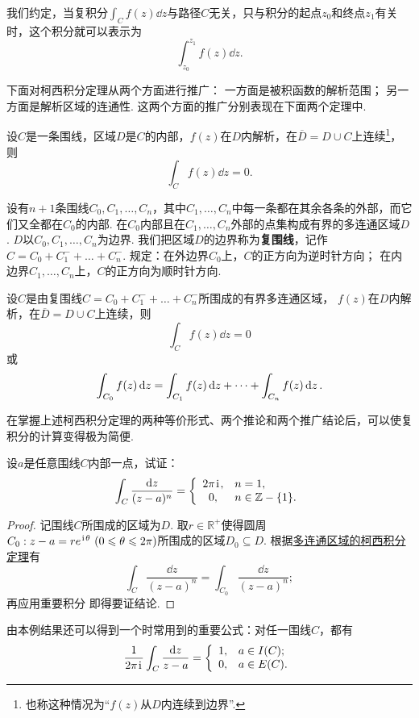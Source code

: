 我们约定，当复积分\(\int_C f(z) \dd{z}\)与路径\(C\)无关，只与积分的起点\(z_0\)和终点\(z_1\)有关时，这个积分就可以表示为\[
\int_{z_0}^{z_1} f(z) \dd{z}.
\]

下面对柯西积分定理从两个方面进行推广：
一方面是被积函数的解析范围；
另一方面是解析区域的连通性.
这两个方面的推广分别表现在下面两个定理中.
\begin{theorem}
设\(C\)是一条围线，区域\(D\)是\(C\)的内部，\(f(z)\)在\(D\)内解析，在\(\overline{D}=D \cup C\)上连续\footnote{%
也称这种情况为“\(f(z)\)从\(D\)内连续到边界”.%
}，则\[
\int_C f(z) \dd{z} = 0.
\]
\end{theorem}

\begin{definition}
设有\(n+1\)条围线\(C_0,C_1,\dots,C_n\)，其中\(C_1,\dots,C_n\)中每一条都在其余各条的外部，而它们又全都在\(C_0\)的内部.
在\(C_0\)内部且在\(C_1,\dots,C_n\)外部的点集构成有界的多连通区域\(D\).
\(D\)以\(C_0,C_1,\dots,C_n\)为边界.
我们把区域\(D\)的边界称为\textbf{复围线}，记作\(C=C_0+C_1^-+\dots+C_n^-\).
规定：在外边界\(C_0\)上，\(C\)的正方向为逆时针方向；
在内边界\(C_1,\dots,C_n\)上，\(C\)的正方向为顺时针方向.
\end{definition}

\begin{theorem}[多连通区域的柯西积分定理]\label{theorem:解析函数的积分表示.多连通区域的柯西积分定理}
设\(C\)是由复围线\(C=C_0+C_1^-+\dots+C_n^-\)所围成的有界多连通区域，%
\(f(z)\)在\(D\)内解析，在\(\overline{D}=D \cup C\)上连续，则\[
\int_C f(z) \dd{z} = 0
\]或\begin{equation}
\def\Ic#1{\int_{C_{#1}} f(z) \dd{z}}
\Ic{0} = \Ic{1} + \dots + \Ic{n}.
\end{equation}
\end{theorem}

在掌握上述柯西积分定理的两种等价形式、两个推论和两个推广结论后，可以使复积分的计算变得极为简便.

\begin{example}
设\(a\)是任意围线\(C\)内部一点，试证：\[
\int_C \frac{\dd{z}}{(z-a)^n} = \left\{ \begin{array}{cl}
2\pi\kern1pt\mathrm{i}\kern1pt, & n=1, \\
0, & n\in\mathbb{Z}-\{1\}.
\end{array} \right.
\]
\begin{proof}
记围线\(C\)所围成的区域为\(D\).
取\(r\in\mathbb{R}^+\)使得圆周\(C_0: z - a = r e^{\kern1pt\mathrm{i}\kern1pt\theta}\ (0 \leqslant \theta \leqslant 2\pi)\)所围成的区域\(D_0 \subseteq D\).
根据\hyperref[theorem:解析函数的积分表示.多连通区域的柯西积分定理]{多连通区域的柯西积分定理}有\[
\int_C \frac{\dd{z}}{(z-a)^n} = \int_{C_0} \frac{\dd{z}}{(z-a)^n};
\]再应用重要积分  即得要证结论.
\end{proof}
\end{example}
由本例结果还可以得到一个时常用到的重要公式：对任一围线\(C\)，都有\begin{equation}\label{equation.解析函数的积分表示.重要积分2}
\frac{1}{2\pi\kern1pt\mathrm{i}\kern1pt} \int_C \frac{\dd{z}}{z-a}
= \left\{ \begin{array}{ll}
1, & a \in I(C); \\
0, & a \in E(C).
\end{array} \right.
\end{equation}

